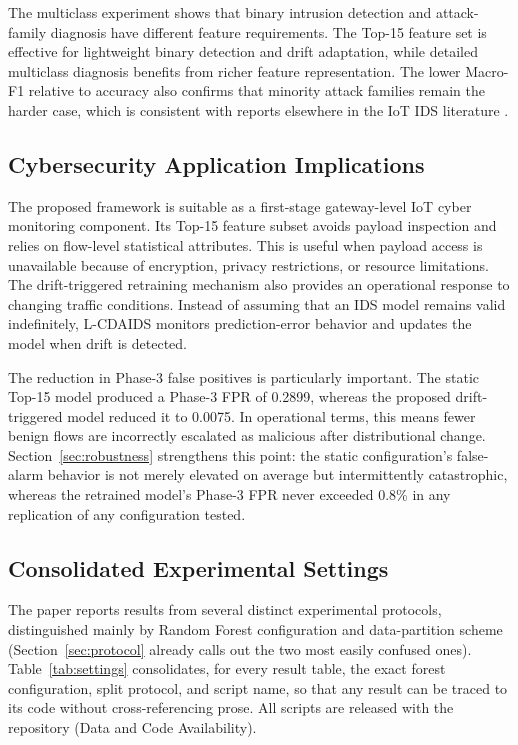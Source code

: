 \documentclass[11pt,a4paper]{article}
\begin{document}
The multiclass experiment shows that binary intrusion detection and
attack-family diagnosis have different feature requirements. The Top-15
feature set is effective for lightweight binary detection and drift
adaptation, while detailed multiclass diagnosis benefits from richer
feature representation. The lower Macro-F1 relative to accuracy also
confirms that minority attack families remain the harder case, which is
consistent with reports elsewhere in the IoT IDS literature
\cite{mishra2024,shanmugam2025}.

\subsection{Cybersecurity Application Implications}

The proposed framework is suitable as a first-stage gateway-level IoT
cyber monitoring component. Its Top-15 feature subset avoids payload
inspection and relies on flow-level statistical attributes. This is
useful when payload access is unavailable because of encryption, privacy
restrictions, or resource limitations. The drift-triggered retraining
mechanism also provides an operational response to changing traffic
conditions. Instead of assuming that an IDS model remains valid
indefinitely, L-CDAIDS monitors prediction-error behavior and updates
the model when drift is detected.

The reduction in Phase-3 false positives is particularly important. The
static Top-15 model produced a Phase-3 FPR of 0.2899, whereas the
proposed drift-triggered model reduced it to 0.0075. In operational
terms, this means fewer benign flows are incorrectly escalated as
malicious after distributional change. Section~\ref{sec:robustness}
strengthens this point: the static configuration's false-alarm behavior
is not merely elevated on average but intermittently catastrophic,
whereas the retrained model's Phase-3 FPR never exceeded 0.8\% in any
replication of any configuration tested.

\subsection{Consolidated Experimental Settings}
\label{sec:settings}

The paper reports results from several distinct experimental protocols,
distinguished mainly by Random Forest configuration and data-partition
scheme (Section~\ref{sec:protocol} already calls out the two most easily
confused ones). Table~\ref{tab:settings} consolidates, for every result
table, the exact forest configuration, split protocol, and script name,
so that any result can be traced to its code without cross-referencing
prose. All scripts are released with the repository (Data and Code
Availability).
\end{document}

